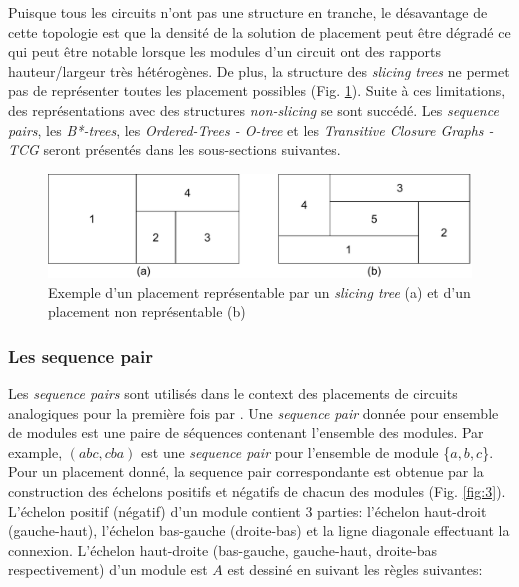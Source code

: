 Puisque tous les circuits n'ont pas une structure en tranche, le désavantage de cette topologie est que la densité de la solution de placement peut être dégradé ce qui peut être notable lorsque les modules d'un circuit ont des rapports hauteur/largeur très hétérogènes. De plus, la structure des {\it slicing trees} ne permet pas de représenter toutes les placement possibles (Fig. \ref{fig:2}). Suite à ces limitations, des représentations avec des structures {\it non-slicing} se sont succédé. Les {\it sequence pairs}, les {\it B*-trees}, les {\it Ordered-Trees - O-tree} et les {\it Transitive Closure Graphs - TCG} seront présentés dans les sous-sections suivantes.
\begin{figure}[h]
\begin{center}
\includegraphics[height=0.15\textheight]{Figures/2.pdf}
\caption{Exemple d'un placement représentable par un {\it slicing tree} (a) et d'un placement non représentable (b)} 
\label{fig:2}
\end{center}
\end{figure}
\subsubsection{Les sequence pair}
Les {\it sequence pairs} sont utilisés dans le context des placements de circuits analogiques pour la première fois par \cite{Balasa2000}. Une {\it sequence pair} donnée pour ensemble de modules est une paire de séquences contenant l'ensemble des modules. Par example, $(abc, cba)$ est une {\it sequence pair} pour l'ensemble de module \{$a,b,c$\}. Pour un placement donné, la sequence pair correspondante est obtenue par la construction des échelons positifs et négatifs de chacun des modules (Fig. \ref{fig:3}). L'échelon positif (négatif) d'un module contient 3 parties: l'échelon haut-droit (gauche-haut), l'échelon bas-gauche (droite-bas) et la ligne diagonale effectuant la connexion. L'échelon  haut-droite (bas-gauche, gauche-haut, droite-bas respectivement) d'un module est $A$ est dessiné en suivant les règles suivantes:

